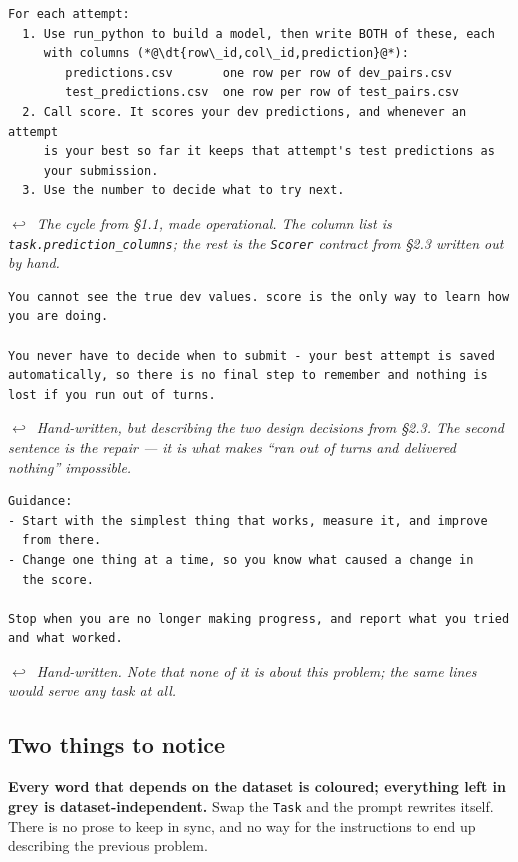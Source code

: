 \documentclass[11pt]{article}
\newcommand{\keyidea}[1]{\begin{idea}#1\end{idea}}
\newcommand{\dt}[1]{\textcolor{taskink}{\bfseries #1}}
\newcommand{\from}[1]{\vspace{-2pt}\par\noindent\hspace*{12pt}%
  \begin{minipage}{\dimexpr\linewidth-14pt\relax}
  {\small\color{midgrey}$\hookleftarrow$~\itshape #1}
  \end{minipage}\par\smallskip}
\begin{document}
\begin{lstlisting}[style=prompt]
For each attempt:
  1. Use run_python to build a model, then write BOTH of these, each
     with columns (*@\dt{row\_id,col\_id,prediction}@*):
        predictions.csv       one row per row of dev_pairs.csv
        test_predictions.csv  one row per row of test_pairs.csv
  2. Call score. It scores your dev predictions, and whenever an attempt
     is your best so far it keeps that attempt's test predictions as
     your submission.
  3. Use the number to decide what to try next.
\end{lstlisting}
\from{The cycle from \S1.1, made operational. The column list is
\texttt{task.prediction\_columns}; the rest is the \texttt{Scorer} contract from \S2.3 written
out by hand.}

\begin{lstlisting}[style=prompt]
You cannot see the true dev values. score is the only way to learn how
you are doing.

You never have to decide when to submit - your best attempt is saved
automatically, so there is no final step to remember and nothing is
lost if you run out of turns.
\end{lstlisting}
\from{Hand-written, but describing the two design decisions from \S2.3. The second sentence is the
repair --- it is what makes ``ran out of turns and delivered nothing'' impossible.}

\begin{lstlisting}[style=prompt]
Guidance:
- Start with the simplest thing that works, measure it, and improve
  from there.
- Change one thing at a time, so you know what caused a change in
  the score.

Stop when you are no longer making progress, and report what you tried
and what worked.
\end{lstlisting}
\from{Hand-written. Note that none of it is about \emph{this} problem; the same lines would serve
any task at all.}

\subsection{Two things to notice}

\keyidea{\textbf{Every word that depends on the dataset is coloured; everything left in grey is
dataset-independent.} Swap the \texttt{Task} and the prompt rewrites itself. There is no prose to
keep in sync, and no way for the instructions to end up describing the previous problem.}
\end{document}
